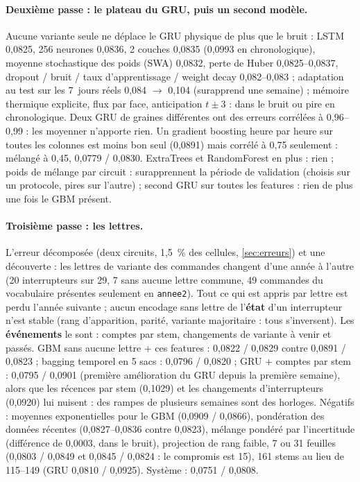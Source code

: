 \documentclass[11pt,a4paper]{article}
\begin{document}
\paragraph{Deuxième passe : le plateau du GRU, puis un second modèle.} Aucune variante seule ne déplace le GRU physique de plus que le bruit : LSTM 0,0825, 256 neurones 0,0836, 2 couches 0,0835 (0,0993 en chronologique), moyenne stochastique des poids (SWA) 0,0832, perte de Huber 0,0825--0,0837, dropout / bruit / taux d'apprentissage / weight decay 0,082--0,083 ; adaptation au test sur les 7~jours réels 0,084 $\rightarrow$ 0,104 (surapprend une semaine) ; mémoire thermique explicite, flux par face, anticipation $t \pm 3$ : dans le bruit ou pire en chronologique. Deux GRU de graines différentes ont des erreurs corrélées à 0,96--0,99 : les moyenner n'apporte rien. Un gradient boosting heure par heure sur toutes les colonnes est moins bon seul (0,0891) mais corrélé à 0,75 seulement : mélangé à 0,45, 0,0779 / 0,0830. ExtraTrees et RandomForest en plus : rien ; poids de mélange par circuit : surapprennent la période de validation (choisis sur un protocole, pires sur l'autre) ; second GRU sur toutes les features : rien de plus une fois le GBM présent.

\paragraph{Troisième passe : les lettres.} L'erreur décomposée (deux circuits, 1,5~\% des cellules, \autoref{sec:erreurs}) et une découverte : les lettres de variante des commandes changent d'une année à l'autre (20 interrupteurs sur 29, 7 sans aucune lettre commune, 49 commandes du vocabulaire présentes seulement en \texttt{annee2}). Tout ce qui est appris par lettre est perdu l'année suivante ; aucun encodage sans lettre de l'\textbf{état} d'un interrupteur n'est stable (rang d'apparition, parité, variante majoritaire : tous s'inversent). Les \textbf{événements} le sont : comptes par stem, changements de variante à venir et passés. GBM sans aucune lettre + ces features : 0,0822 / 0,0829 contre 0,0891 / 0,0823 ; bagging temporel en 5 sacs : 0,0796 / 0,0820 ; GRU + comptes par stem : 0,0795 / 0,0901 (première amélioration du GRU depuis la première semaine), alors que les récences par stem (0,1029) et les changements d'interrupteurs (0,0920) lui nuisent : des rampes de plusieurs semaines sont des horloges. Négatifs : moyennes exponentielles pour le GBM (0,0909 / 0,0866), pondération des données récentes (0,0827--0,0836 contre 0,0823), mélange pondéré par l'incertitude (différence de 0,0003, dans le bruit), projection de rang faible, 7 ou 31 feuilles (0,0803 / 0,0849 et 0,0845 / 0,0824 : le compromis est 15), 161 stems au lieu de 115--149 (GRU 0,0810 / 0,0925). Système : 0,0751 / 0,0808.
\end{document}
